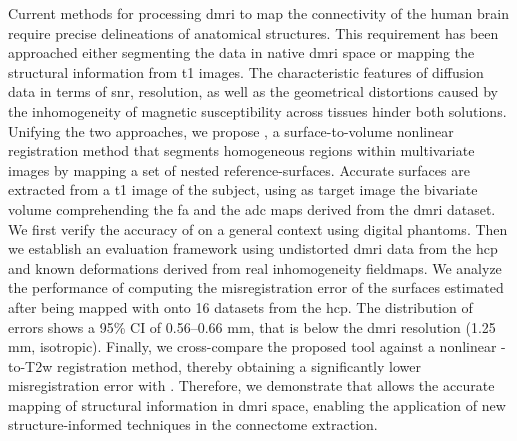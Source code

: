 Current methods for processing \gls*{dmri} to map the connectivity of the human brain
  require precise delineations of anatomical structures.
This requirement has been approached either segmenting the data in native \gls*{dmri} space
  or mapping the structural information from \gls*{t1} images.
The characteristic features of diffusion data in terms of \acrlong*{snr}, resolution, as well
  as the geometrical distortions caused by the inhomogeneity of magnetic susceptibility
  across tissues hinder both solutions.
Unifying the two approaches, we propose \regseg{}, a surface-to-volume nonlinear
  registration method that segments homogeneous regions within multivariate images by mapping
  a set of nested reference-surfaces.
Accurate surfaces are extracted from a \gls*{t1} image of the subject, using as target image
  the bivariate volume comprehending the \gls*{fa} and the \gls*{adc} maps derived from the
  \gls*{dmri} dataset.
We first verify the accuracy of \regseg{} on a general context using digital phantoms.
Then we establish an evaluation framework using undistorted \gls*{dmri} data from the \gls*{hcp}
  and known deformations derived from real inhomogeneity fieldmaps.
We analyze the performance of \regseg{} computing the misregistration error of the surfaces estimated
  after being mapped with \regseg{} onto 16 datasets from the \gls*{hcp}.
The distribution of errors shows a 95\% CI of 0.56--0.66 mm, that is below the \gls*{dmri}
  resolution (1.25 mm, isotropic).
Finally, we cross-compare the proposed tool against a nonlinear \lowb{}-to-T2w registration
  method, thereby obtaining a significantly lower misregistration error with \regseg{}.
Therefore, we demonstrate that \regseg{} allows the accurate mapping of structural information
  in \gls*{dmri} space, enabling the application of new structure-informed techniques in
  the connectome extraction.